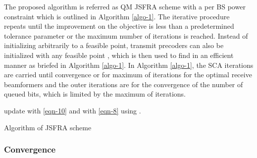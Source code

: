 The proposed algorithm is referred as \acl{QM} \ac{JSFRA} scheme with a per \ac{BS} power constraint which is outlined in Algorithm \ref{algo-1}. The iterative procedure repeats until the improvement on the objective is less than a predetermined tolerance parameter or the maximum number of iterations is reached. Instead of initializing  arbitrarily to a feasible point, transmit precoders can also be initialized with any feasible point , which is then used to find  in an efficient manner as briefed in Algorithm \ref{algo-1}. In Algorithm \ref{algo-1}, the \ac{SCA} iterations are carried until convergence or for maximum of  iterations for the optimal  receive beamformers and the outer iterations are for the convergence of the number of queued bits, which is limited by the maximum of  iterations.
\begin{algorithm}
 \SetAlgoLined
 \DontPrintSemicolon
 \BlankLine
 update  with \eqref{eqn-10} and  with \eqref{eqn-8} using .\;
 \caption{Algorithm of \acs{JSFRA} scheme}
 \label{algo-1}
\end{algorithm}

\subsubsection*{Convergence}

